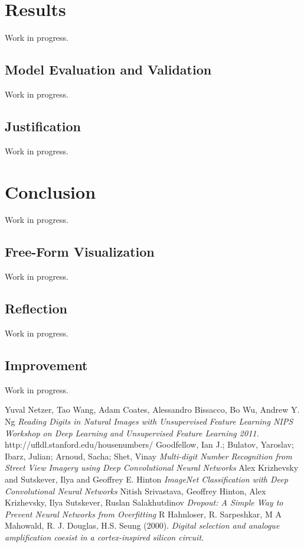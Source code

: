 \documentclass[12pt]{article}
\begin{document}
\section{Results}
Work in progress.

\subsection{Model Evaluation and Validation}
Work in progress.

\subsection{Justification}
Work in progress.

\section{Conclusion}
Work in progress.

\subsection{Free-Form Visualization}
Work in progress.

\subsection{Reflection}
Work in progress.

\subsection{Improvement}
Work in progress.


\begin{thebibliography}{9}
Yuval Netzer, Tao Wang, Adam Coates, Alessandro Bissacco, Bo Wu, Andrew Y. Ng 
\textit{Reading Digits in Natural Images with Unsupervised Feature Learning NIPS Workshop on Deep Learning and Unsupervised Feature Learning 2011.}
http://ufldl.stanford.edu/housenumbers/
Goodfellow, Ian J.; Bulatov, Yaroslav; Ibarz, Julian; Arnoud, Sacha; Shet, Vinay
\textit{Multi-digit Number Recognition from Street View Imagery using Deep Convolutional Neural Networks}
Alex Krizhevsky and Sutskever, Ilya and Geoffrey E. Hinton
\textit{ImageNet Classification with Deep Convolutional Neural Networks}
Nitish Srivastava, Geoffrey Hinton, Alex Krizhevsky, Ilya Sutskever, Ruslan Salakhutdinov
\textit{Dropout: A Simple Way to Prevent Neural Networks from Overfitting}
R Hahnloser, R. Sarpeshkar, M A Mahowald, R. J. Douglas, H.S. Seung (2000). 
\textit{Digital selection and analogue amplification coesist in a cortex-inspired silicon circuit.}

\end{thebibliography}
	
\end{document}
